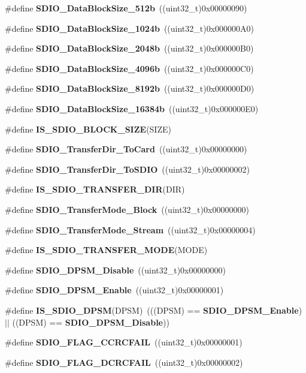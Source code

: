 \begin{DoxyCompactItemize}
\item 
\#define \textbf{ S\+D\+I\+O\+\_\+\+Data\+Block\+Size\+\_\+512b}~((uint32\+\_\+t)0x00000090)
\item 
\#define \textbf{ S\+D\+I\+O\+\_\+\+Data\+Block\+Size\+\_\+1024b}~((uint32\+\_\+t)0x000000\+A0)
\item 
\#define \textbf{ S\+D\+I\+O\+\_\+\+Data\+Block\+Size\+\_\+2048b}~((uint32\+\_\+t)0x000000\+B0)
\item 
\#define \textbf{ S\+D\+I\+O\+\_\+\+Data\+Block\+Size\+\_\+4096b}~((uint32\+\_\+t)0x000000\+C0)
\item 
\#define \textbf{ S\+D\+I\+O\+\_\+\+Data\+Block\+Size\+\_\+8192b}~((uint32\+\_\+t)0x000000\+D0)
\item 
\#define \textbf{ S\+D\+I\+O\+\_\+\+Data\+Block\+Size\+\_\+16384b}~((uint32\+\_\+t)0x000000\+E0)
\item 
\#define \textbf{ I\+S\+\_\+\+S\+D\+I\+O\+\_\+\+B\+L\+O\+C\+K\+\_\+\+S\+I\+ZE}(S\+I\+ZE)
\item 
\#define \textbf{ S\+D\+I\+O\+\_\+\+Transfer\+Dir\+\_\+\+To\+Card}~((uint32\+\_\+t)0x00000000)
\item 
\#define \textbf{ S\+D\+I\+O\+\_\+\+Transfer\+Dir\+\_\+\+To\+S\+D\+IO}~((uint32\+\_\+t)0x00000002)
\item 
\#define \textbf{ I\+S\+\_\+\+S\+D\+I\+O\+\_\+\+T\+R\+A\+N\+S\+F\+E\+R\+\_\+\+D\+IR}(D\+IR)
\item 
\#define \textbf{ S\+D\+I\+O\+\_\+\+Transfer\+Mode\+\_\+\+Block}~((uint32\+\_\+t)0x00000000)
\item 
\#define \textbf{ S\+D\+I\+O\+\_\+\+Transfer\+Mode\+\_\+\+Stream}~((uint32\+\_\+t)0x00000004)
\item 
\#define \textbf{ I\+S\+\_\+\+S\+D\+I\+O\+\_\+\+T\+R\+A\+N\+S\+F\+E\+R\+\_\+\+M\+O\+DE}(M\+O\+DE)
\item 
\#define \textbf{ S\+D\+I\+O\+\_\+\+D\+P\+S\+M\+\_\+\+Disable}~((uint32\+\_\+t)0x00000000)
\item 
\#define \textbf{ S\+D\+I\+O\+\_\+\+D\+P\+S\+M\+\_\+\+Enable}~((uint32\+\_\+t)0x00000001)
\item 
\#define \textbf{ I\+S\+\_\+\+S\+D\+I\+O\+\_\+\+D\+P\+SM}(D\+P\+SM)~(((D\+P\+SM) == \textbf{ S\+D\+I\+O\+\_\+\+D\+P\+S\+M\+\_\+\+Enable}) $\vert$$\vert$ ((D\+P\+SM) == \textbf{ S\+D\+I\+O\+\_\+\+D\+P\+S\+M\+\_\+\+Disable}))
\item 
\#define \textbf{ S\+D\+I\+O\+\_\+\+F\+L\+A\+G\+\_\+\+C\+C\+R\+C\+F\+A\+IL}~((uint32\+\_\+t)0x00000001)
\item 
\#define \textbf{ S\+D\+I\+O\+\_\+\+F\+L\+A\+G\+\_\+\+D\+C\+R\+C\+F\+A\+IL}~((uint32\+\_\+t)0x00000002)
$$
\end{DoxyCompactItemize}

